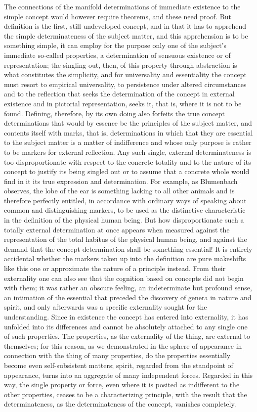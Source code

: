 The connections of the manifold determinations of
immediate existence to the simple concept
would however require theorems,
and these need proof.
But definition is the first, still undeveloped concept,
and in that it has to apprehend
the simple determinateness of the subject matter,
and this apprehension is to be something simple,
it can employ for the purpose only one of
the subject's immediate so-called properties,
a determination of sensuous existence or of representation;
the singling out, then, of this property through abstraction is
what constitutes the simplicity,
and for universality and essentiality
the concept must resort to empirical universality,
to persistence under altered circumstances
and to the reflection that seeks
the determination of the concept
in external existence and in pictorial representation,
seeks it, that is, where it is not to be found.
Defining, therefore, by its own doing also forfeits
the true concept determinations that would by essence
be the principles of the subject matter,
and contents itself with marks, that is,
determinations in which that they are essential
to the subject matter is a matter of indifference
and whose only purpose is rather to be
markers for external reflection.
Any such single, external determinateness is
too disproportionate with respect to the concrete totality
and to the nature of its concept to justify its being singled
out or to assume that a concrete whole
would find in it its true expression and determination.
For example, as Blumenbach observes,
the lobe of the ear is something lacking
to all other animals and is therefore perfectly entitled,
in accordance with ordinary ways of
speaking about common and distinguishing markers,
to be used as the distinctive characteristic in the
definition of the physical human being.
But how disproportionate such
a totally external determination
at once appears when measured
against the representation of
the total habitus of the physical human being,
and against the demand that
the concept determination shall be something essential!
It is entirely accidental whether the markers taken up
into the definition are pure makeshifts like this one
or approximate the nature of a principle instead.
From their externality one can also see that
the cognition based on concepts did not begin with them;
it was rather an obscure feeling,
an indeterminate but profound sense,
an intimation of the essential
that preceded the discovery of
genera in nature and spirit,
and only afterwards was a specific
externality sought for the understanding.
Since in existence the concept has entered into externality,
it has unfolded into its differences
and cannot be absolutely attached to
any single one of such properties.
The properties, as the externality of the thing,
are external to themselves;
for this reason, as we demonstrated
in the sphere of appearance
in connection with the thing of many properties,
do the properties essentially become
even self-subsistent matters;
spirit, regarded from the standpoint of appearance,
turns into an aggregate of many independent forces.
Regarded in this way, the single property or force,
even where it is posited as indifferent to
the other properties,
ceases to be a characterizing principle,
with the result that the determinateness,
as the determinateness of the concept,
vanishes completely.

